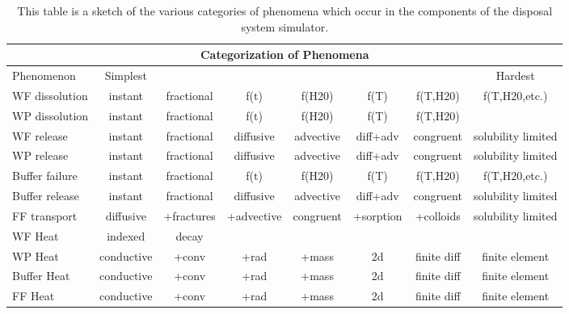 %
\begin{table}
  \centering
  \footnotesize{
  \begin{tabularx}{\textwidth}{|l|c|c|c|c|c|c|c|}
    \multicolumn{8}{c}{\textbf{Categorization of Phenomena}}\\
    \hline
     Phenomenon&Simplest&&&&&&Hardest\\
    \hline
     WF dissolution&instant&fractional&f(t)&f(H20)&f(T)&f(T,H20)&f(T,H20,etc.)\\
     WP dissolution&instant&fractional&f(t)&f(H20)&f(T)&f(T,H20)&\\
     WF release&instant&fractional&diffusive&advective&diff+adv&congruent&solubility limited\\
     WP release&instant&fractional&diffusive&advective&diff+adv&congruent&solubility limited\\
     Buffer failure&instant&fractional&f(t)&f(H20)&f(T)&f(T,H20)&f(T,H20,etc.)\\
     Buffer release &instant&fractional&diffusive&advective&diff+adv&congruent&solubility limited\\
     FF transport &diffusive&+fractures&+advective&congruent&+sorption&+colloids&solubility limited\\
     WF Heat&indexed&decay&&&&&\\
     WP Heat&conductive&+conv&+rad&+mass&2d&finite diff&finite element\\
     Buffer Heat&conductive&+conv&+rad&+mass&2d&finite diff&finite element\\
     FF Heat&conductive&+conv&+rad&+mass&2d&finite diff&finite element\\
    \hline
  \end{tabularx}
  \caption[Categorization of Phenomena]{This table is a sketch of 
  the various categories of phenomena which occur in the components of the  
  disposal system simulator.}
  \label{tab:cat}
  }
\end{table}


